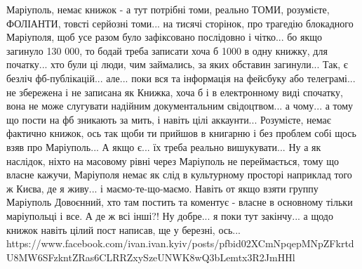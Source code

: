 Маріуполь, немає книжок - а тут потрібні томи, реально ТОМИ, розумієте,
ФОЛІАНТИ, товсті серйозні томи... на тисячі сторінок, про трагедію блокадного
Маріуполя, щоб усе разом було зафіксовано послідовно і чітко... бо якщо
загинуло 130 000, то бодай треба записати хоча б 1000 в одну книжку, для
початку... хто були ці люди, чим займались, за яких обставин загинули... Так, є
безліч фб-публікацій... але... поки вся та інформація на фейсбуку або
телеграмі... не збережена і не записана як Книжка, хоча б і в електронному виді
спочатку, вона не може слугувати надійним документальним свідоцтвом... а
чому... а тому що пости на фб зникають за мить, і навіть цілі аккаунти...
Розумієте, немає фактично книжок, ось так щоби ти прийшов в книгарню і без
проблем собі щось взяв про Маріуполь... А якщо є... їх треба реально
вишукувати... Ну а як наслідок, ніхто на масовому рівні через Маріуполь не
переймається, тому що власне кажучи, Маріуполя немає як слід в культурному
просторі наприклад того ж Києва, де я живу... і маємо-те-що-маємо. Навіть от
якщо взяти группу Маріуполь Довоєнний, хто там постить та коментує - власне в
основному тільки маріупольці і все. А де ж всі інші?! Ну добре... я поки тут
закінчу... а щодо книжок навіть цілий пост написав, ще у березні, ось...
https://www.facebook.com/ivan.ivan.kyiv/posts/pfbid02XCmNpqepMNpZFkrtdU8MW6SFzkntZRas6CLRRZxySzeUNWK8wQ3bLemtx3R2JmHHl


